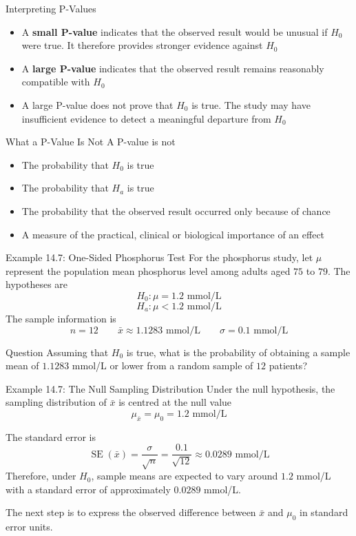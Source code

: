 \documentclass[aspectratio=169]{beamer}
\begin{document}
\begin{frame}{Interpreting P-Values}
\begin{itemize}
	\item A \textbf{small P-value} indicates that the observed result would be unusual if $H_0$ were true. It therefore provides stronger evidence against $H_0$
	\item A \textbf{large P-value} indicates that the observed result remains reasonably compatible with $H_0$
	\item A large P-value does not prove that $H_0$ is true. The study may have insufficient evidence to detect a meaningful departure from $H_0$
\end{itemize}

\vspace{0.15cm}
\begin{alertblock}{What a P-Value Is Not}
A P-value is not
\begin{itemize}
	\item The probability that $H_0$ is true
	\item The probability that $H_a$ is true
	\item The probability that the observed result occurred only because of chance
  	\item A measure of the practical, clinical or biological importance of an effect
\end{itemize}
\end{alertblock}
\end{frame}

\begin{frame}{Example 14.7: One-Sided Phosphorus Test}
For the phosphorus study, let $\mu$ represent the population mean phosphorus level among adults aged $75$ to $79$. The hypotheses are
$$H_0:\mu=1.2\text{ mmol/L}$$
$$H_a:\mu<1.2\text{ mmol/L}$$
The sample information is
$$n=12 \qquad \bar{x}\approx1.1283\text{ mmol/L} \qquad \sigma=0.1\text{ mmol/L}$$

\begin{block}{Question}
Assuming that $H_0$ is true, what is the probability of obtaining a sample mean of $1.1283$ mmol/L or lower from a random sample of $12$ patients?
\end{block}
\end{frame}

\begin{frame}{Example 14.7: The Null Sampling Distribution}
Under the null hypothesis, the sampling distribution of $\bar{x}$ is centred at the null value
$$\mu_{\bar{x}}=\mu_0=1.2\text{ mmol/L}$$

The standard error is
$$\operatorname{SE}(\bar{x})=\frac{\sigma}{\sqrt{n}}=\frac{0.1}{\sqrt{12}}\approx0.0289\text{ mmol/L}$$
Therefore, under $H_0$, sample means are expected to vary around $1.2$ mmol/L with a standard error of approximately $0.0289$ mmol/L.

\vspace{0.2cm}
The next step is to express the observed difference between $\bar{x}$ and $\mu_0$ in standard error units.
\end{frame}
\end{document}
